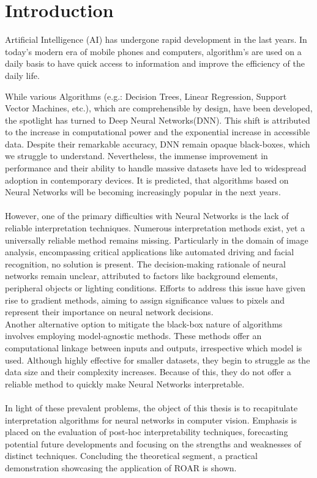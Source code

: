 
\chapter{Introduction}

Artificial Intelligence (AI) has undergone rapid development in the last years. In today's modern era of mobile phones and computers, algorithm's are used on a daily basis to have quick access to information and improve the efficiency of the daily life.

While various Algorithms (e.g.: Decision Trees, Linear Regression, Support Vector Machines, etc.), which are comprehensible by design, have been developed, the spotlight has turned to Deep Neural Networks(DNN). This shift is attributed to the increase in computational power and the exponential increase in accessible data. Despite their remarkable accuracy, DNN remain opaque black-boxes, which we  struggle to understand. Nevertheless, the immense improvement in performance and their ability to handle massive datasets have led to widespread adoption in contemporary devices. It is predicted, that algorithms based on Neural Networks will be becoming increasingly popular in the next years.
\\\\
However, one of the primary difficulties with Neural Networks is the lack of reliable interpretation techniques. Numerous interpretation methods exist, yet a universally reliable method remains missing. Particularly in the domain of image analysis, encompassing critical applications like automated driving and facial recognition, no solution is present. The decision-making rationale of neural networks remain unclear, attributed to factors like background elements, peripheral objects or lighting conditions.
Efforts to address this issue have given rise to gradient methods, aiming to assign significance values to pixels and represent their importance on neural network decisions.
\\
Another alternative option to mitigate the black-box nature of  algorithms involves employing model-agnostic methods. These methods offer an computational linkage between inputs and outputs, irrespective which model is used. Although highly effective for smaller datasets, they begin to struggle as the data size and their complexity increases. Because of this, they do not offer a reliable method to quickly make Neural Networks interpretable.
\\\\
In light of these prevalent problems, the object of this thesis is to recapitulate interpretation algorithms for neural networks in computer vision.  Emphasis is placed on the evaluation of post-hoc interpretability techniques, forecasting potential future developments and focusing on the strengths and weaknesses of distinct  techniques. Concluding the theoretical segment, a practical demonstration showcasing the application of ROAR is shown. 






